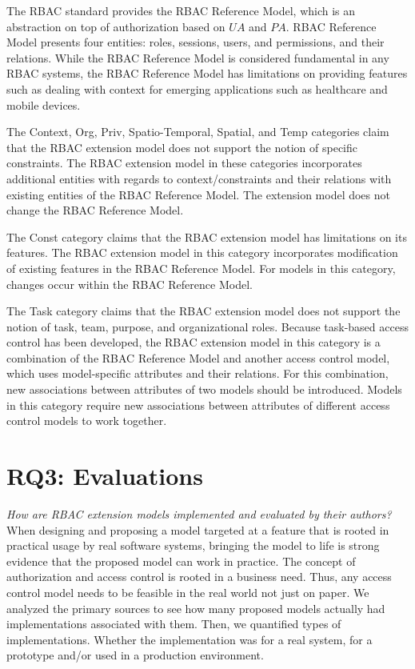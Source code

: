 The RBAC standard provides the RBAC Reference Model, which is an abstraction on top of authorization based on $UA$ and $PA$. 
RBAC Reference Model presents four entities: roles, sessions, users, and permissions, and their relations. 
While the RBAC Reference Model is considered fundamental in any RBAC systems, the RBAC Reference Model has limitations on providing features such as dealing with context for emerging applications such as healthcare and mobile devices. 

The Context, Org, Priv, Spatio-Temporal, Spatial, and Temp categories claim that the RBAC extension model does not support the notion of specific constraints. 
The RBAC extension model in these categories incorporates additional entities with regards to context/constraints and their relations with existing entities of the RBAC Reference Model. 
The extension model does not change the RBAC Reference Model.

The Const category claims that the RBAC extension model has limitations on its features. 
The RBAC extension model in this category incorporates modification of existing features in the RBAC Reference Model. 
For models in this category, changes occur within the RBAC Reference Model.

The Task category claims that the RBAC extension model does not support the notion of task, team, purpose, and organizational roles. 
Because task-based access control has been developed, the RBAC extension model in this category is a combination of the RBAC Reference Model and another access control model, which uses model-specific attributes and their relations. 
For this combination, new associations between attributes of two models should be introduced. 
Models in this category require new associations between attributes of different access control models to work together.


\section{RQ3: Evaluations} \label{sec:evaluations}

\textit{How are RBAC extension models implemented and evaluated by their authors?}
\\

When designing and proposing a model targeted at a feature that is rooted in practical usage by real software systems, bringing the model to life is strong evidence that the proposed model can work in practice. 
The concept of authorization and access control is rooted in a business need. 
Thus, any access control model needs to be feasible in the real world not just on paper. 
We analyzed the primary sources to see how many proposed models actually had implementations associated with them. 
Then, we quantified types of implementations. 
Whether the implementation was for a real system, for a prototype and/or used in a production environment.

